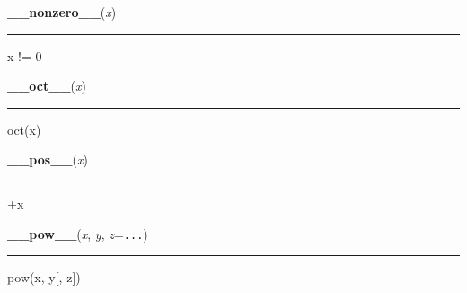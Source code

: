     \begin{boxedminipage}{\textwidth}

    \raggedright \textbf{\_\_nonzero\_\_}(\textit{x})

    \vspace{-1.5ex}

    \rule{\textwidth}{0.5\fboxrule}

x != 0
    \vspace{1ex}

    \end{boxedminipage}

    \label{numpy:ndarray:__oct__}

    \vspace{0.5ex}

    \begin{boxedminipage}{\textwidth}

    \raggedright \textbf{\_\_oct\_\_}(\textit{x})

    \vspace{-1.5ex}

    \rule{\textwidth}{0.5\fboxrule}

oct(x)
    \vspace{1ex}

    \end{boxedminipage}

    \label{numpy:ndarray:__pos__}

    \vspace{0.5ex}

    \begin{boxedminipage}{\textwidth}

    \raggedright \textbf{\_\_pos\_\_}(\textit{x})

    \vspace{-1.5ex}

    \rule{\textwidth}{0.5\fboxrule}

+x
    \vspace{1ex}

    \end{boxedminipage}

    \label{numpy:ndarray:__pow__}

    \vspace{0.5ex}

    \begin{boxedminipage}{\textwidth}

    \raggedright \textbf{\_\_pow\_\_}(\textit{x}, \textit{y}, \textit{z}=\texttt{...})

    \vspace{-1.5ex}

    \rule{\textwidth}{0.5\fboxrule}

pow(x, y{[}, z{]})
    \vspace{1ex}

    \end{boxedminipage}

